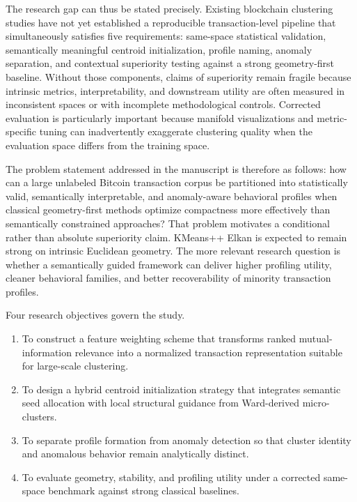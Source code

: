 \documentclass{ieeeaccess}
\begin{document}
The research gap can thus be stated precisely. Existing blockchain clustering studies have not yet established a reproducible transaction-level pipeline that simultaneously satisfies five requirements: same-space statistical validation, semantically meaningful centroid initialization, profile naming, anomaly separation, and contextual superiority testing against a strong geometry-first baseline. Without those components, claims of superiority remain fragile because intrinsic metrics, interpretability, and downstream utility are often measured in inconsistent spaces or with incomplete methodological controls. Corrected evaluation is particularly important because manifold visualizations and metric-specific tuning can inadvertently exaggerate clustering quality when the evaluation space differs from the training space.

The problem statement addressed in the manuscript is therefore as follows: how can a large unlabeled Bitcoin transaction corpus be partitioned into statistically valid, semantically interpretable, and anomaly-aware behavioral profiles when classical geometry-first methods optimize compactness more effectively than semantically constrained approaches? That problem motivates a conditional rather than absolute superiority claim. KMeans++ Elkan is expected to remain strong on intrinsic Euclidean geometry. The more relevant research question is whether a semantically guided framework can deliver higher profiling utility, cleaner behavioral families, and better recoverability of minority transaction profiles.

Four research objectives govern the study.
\begin{enumerate}
\item To construct a feature weighting scheme that transforms ranked mutual-information relevance into a normalized transaction representation suitable for large-scale clustering.
\item To design a hybrid centroid initialization strategy that integrates semantic seed allocation with local structural guidance from Ward-derived micro-clusters.
\item To separate profile formation from anomaly detection so that cluster identity and anomalous behavior remain analytically distinct.
\item To evaluate geometry, stability, and profiling utility under a corrected same-space benchmark against strong classical baselines.
\end{enumerate}
\end{document}
